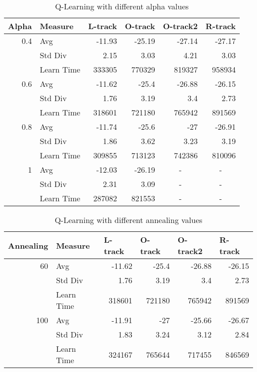 \documentclass[12pt, letterpaper]{article}
\begin{document}
\begin{table}[htbp]
\caption{Q-Learning with different alpha values}
\begin{center}
\begin{tabular}{|l|l|r|r|r|r|}
\hline
\textbf{Alpha} & \textbf{Measure} & \multicolumn{1}{l|}{\textbf{L-track}} & \multicolumn{1}{l|}{\textbf{O-track}} & \multicolumn{1}{l|}{\textbf{O-track2}} & \multicolumn{1}{l|}{\textbf{R-track}} \\ \hline
\multicolumn{1}{|r|}{0.4} & Avg & -11.93 & -25.19 & -27.14 & -27.17 \\ \hline
 & Std Div & 2.15 & 3.03 & 4.21 & 3.03 \\ \hline
 & Learn Time & 333305 & 770329 & 819327 & 958934 \\ \hline
\multicolumn{1}{|r|}{0.6} & Avg & -11.62 & -25.4 & -26.88 & -26.15 \\ \hline
 & Std Div & 1.76 & 3.19 & 3.4 & 2.73 \\ \hline
 & Learn Time & 318601 & 721180 & 765942 & 891569 \\ \hline
\multicolumn{1}{|r|}{0.8} & Avg & -11.74 & -25.6 & -27 & -26.91 \\ \hline
 & Std Div & 1.86 & 3.62 & 3.23 & 3.19 \\ \hline
 & Learn Time & 309855 & 713123 & 742386 & 810096 \\ \hline
\multicolumn{1}{|r|}{1} & Avg & -12.03 & -26.19 & \multicolumn{1}{c|}{-} & \multicolumn{1}{c|}{-} \\ \hline
 & Std Div & 2.31 & 3.09 & \multicolumn{1}{c|}{-} & \multicolumn{1}{c|}{-} \\ \hline
 & Learn Time & 287082 & 821553 & \multicolumn{1}{c|}{-} & \multicolumn{1}{c|}{-} \\ \hline
\end{tabular}
\end{center}
\label{q_alpha}
\end{table}

\begin{table}[htbp]
\caption{Q-Learning with different annealing values}
\begin{center}
\begin{tabular}{|l|l|r|r|r|r|}
\hline
\textbf{Annealing} & \textbf{Measure} & \multicolumn{1}{l|}{\textbf{L-track}} & \multicolumn{1}{l|}{\textbf{O-track}} & \multicolumn{1}{l|}{\textbf{O-track2}} & \multicolumn{1}{l|}{\textbf{R-track}} \\ \hline
\multicolumn{1}{|r|}{60} & Avg & -11.62 & -25.4 & -26.88 & -26.15 \\ \hline
 & Std Div & 1.76 & 3.19 & 3.4 & 2.73 \\ \hline
 & Learn Time & 318601 & 721180 & 765942 & 891569 \\ \hline
\multicolumn{1}{|r|}{100} & Avg & -11.91 & -27 & -25.66 & -26.67 \\ \hline
 & Std Div & 1.83 & 3.24 & 3.12 & 2.84 \\ \hline
 & Learn Time & 324167 & 765644 & 717455 & 846569 \\ \hline
\end{tabular}
\end{center}
\label{q_anneal}
\end{table}
\end{document}

